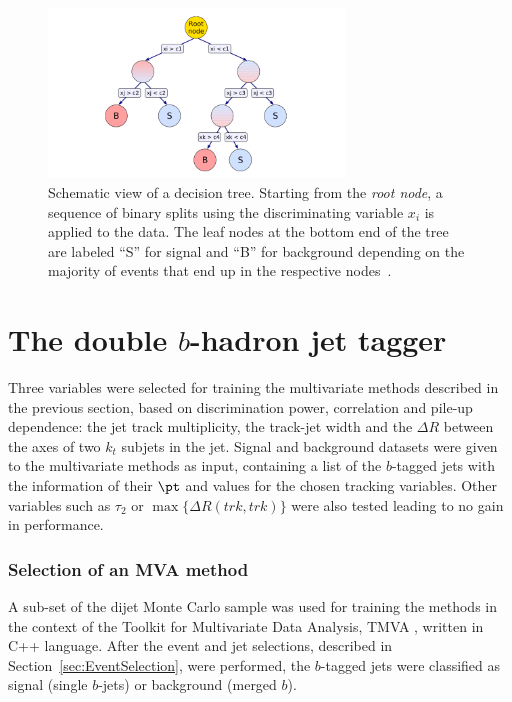 \begin{figure}[tp]
\centering
\includegraphics[width=0.7\textwidth]{BDT.png}
\caption{Schematic view of a decision tree. Starting from the \emph{root node}, a sequence  of binary splits using the discriminating variable $x_i$ is applied to the data. The leaf nodes at the bottom end of the tree are labeled ``S'' for signal and ``B'' for background depending on the majority of events that end up in the respective nodes~\cite{Hocker:2007ht}.} %
\label{fig:BDTsketch}
\end{figure}



\section{The double $b$-hadron jet tagger}

Three variables were selected for training the multivariate methods described in the previous section, based on discrimination power, correlation and pile-up dependence: the jet track multiplicity, the track-jet width and the $\Delta R$ between the axes of two $k_t$ subjets in the jet.  Signal and background datasets were given to the multivariate methods as input, containing a list of the $b$-tagged jets with the information of their $\pt$ and values for the chosen tracking variables.
 Other variables such as $\tau_2$ or $\max\{\Delta R(trk,trk)\}$ were also tested leading to no gain in performance.


\subsubsection{Selection of an MVA method}

A sub-set of the dijet Monte Carlo sample was used for training the methods in the context of the Toolkit for Multivariate Data Analysis, TMVA \cite{Hocker:2007ht}, written in C++ language.  After the event and jet selections, described in Section~\ref{sec:EventSelection}, were performed, the $b$-tagged jets were classified as signal (single $b$-jets) or background (merged $b$). 

